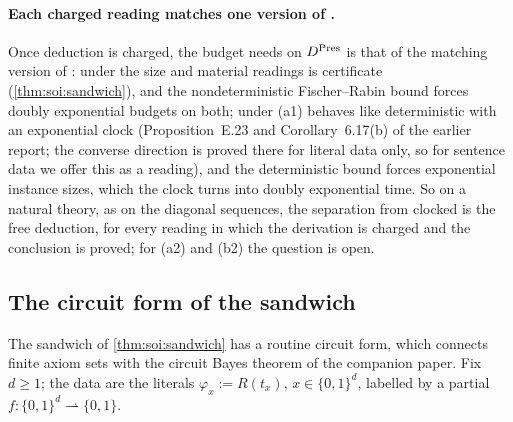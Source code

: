 \paragraph{Each charged reading matches one version of \SOIabbr.}\label{rem:soi:presburgerSummary} Once deduction is charged, the budget \SAIabbr needs on $D^{\rm Pres}$ is that of the matching version of \SOIabbr: under the size and material readings \SAIabbr is certificate \SOIabbr (\cref{thm:soi:sandwich}), and the nondeterministic Fischer--Rabin bound forces doubly exponential budgets on both; under (a1) \SAIabbr behaves like deterministic \SOIabbr with an exponential clock (Proposition~E.23 and Corollary~6.17(b) of the earlier report; the converse direction is proved there for literal data only, so for sentence data we offer this as a reading), and the deterministic bound forces exponential instance sizes, which the clock turns into doubly exponential time. So on a natural theory, as on the diagonal sequences, the separation from clocked \SOIabbr is the free deduction, for every reading in which the derivation is charged and the conclusion is proved; for (a2) and (b2) the question is open.

\subsection{The circuit form of the sandwich}\label{sec:app:soi:circuit}

The sandwich of \cref{thm:soi:sandwich} has a routine circuit form, which connects finite axiom sets with the circuit Bayes theorem of the companion paper. Fix $d\ge1$; the data are the literals $\varphi_x:=R(t_x)$, $x\in\{0,1\}^d$, labelled by a partial $f:\{0,1\}^d\rightharpoonup\{0,1\}$.


